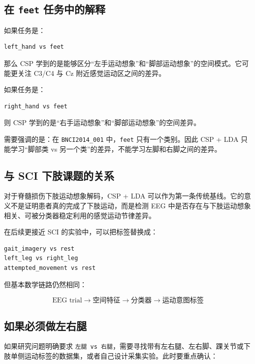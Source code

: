 \documentclass[UTF8,a4paper,12pt]{ctexart}
\begin{document}
\subsection{在 \texttt{feet} 任务中的解释}

如果任务是：

\begin{lstlisting}[language={}]
left_hand vs feet
\end{lstlisting}

那么 CSP 学到的是能够区分“左手运动想象”和“脚部运动想象”的空间模式。它可能更关注 C3/C4 与 Cz 附近感觉运动区之间的差异。

如果任务是：

\begin{lstlisting}[language={}]
right_hand vs feet
\end{lstlisting}

则 CSP 学到的是“右手运动想象”和“脚部运动想象”的空间差异。

需要强调的是：在 \texttt{BNCI2014\_001} 中，\texttt{feet} 只有一个类别。因此 CSP + LDA 只能学习“脚部类 vs 另一个类”的差异，不能学习左脚和右脚之间的差异。

\subsection{与 SCI 下肢课题的关系}

对于脊髓损伤下肢运动想象解码，CSP + LDA 可以作为第一条传统基线。它的意义不是证明患者真的完成了下肢运动，而是检测 EEG 中是否存在与下肢运动想象相关、可被分类器稳定利用的感觉运动节律差异。

在后续更接近 SCI 的实验中，可以把标签替换成：

\begin{lstlisting}[language={}]
gait_imagery vs rest
left_leg vs right_leg
attempted_movement vs rest
\end{lstlisting}

但基本数学链路仍然相同：

\[
\text{EEG trial} \rightarrow \text{空间特征} \rightarrow \text{分类器} \rightarrow \text{运动意图标签}
\]

\subsection{如果必须做左右腿}

如果研究问题明确要求 \texttt{左腿 vs 右腿}，需要寻找带有左右腿、左右脚、踝关节或下肢单侧运动标签的数据集，或者自己设计采集实验。此时要重点确认：
\end{document}
